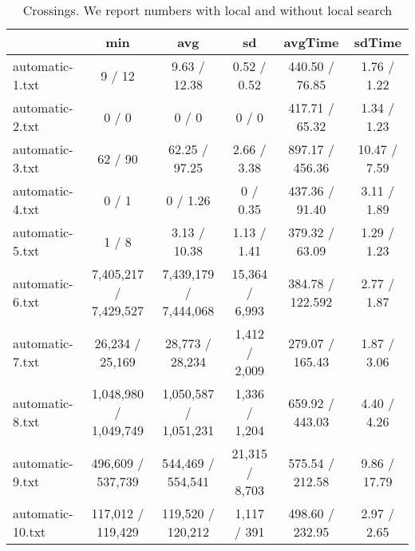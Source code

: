 \documentclass{scrartcl}
\begin{document}
\begin{table}
\scriptsize
\begin{tabular}{lccccc}
  \toprule  & min & avg & sd & avgTime & sdTime \\ 
  \midrule automatic-1.txt & 9 / 12 & 9.63 / 12.38 & 0.52 / 0.52 & 440.50 / 76.85 & 1.76 / 1.22 \\ 
  automatic-2.txt & 0 / 0 & 0 / 0  & 0 / 0 & 417.71 / 65.32 & 1.34 / 1.23 \\ 
  automatic-3.txt & 62 / 90 & 62.25 / 97.25 & 2.66 / 3.38 & 897.17 / 456.36 & 10.47 / 7.59 \\ 
  automatic-4.txt & 0 / 1 & 0 / 1.26 & 0 / 0.35 & 437.36 / 91.40 & 3.11 / 1.89 \\ 
  automatic-5.txt & 1 / 8 & 3.13 / 10.38 & 1.13 / 1.41 & 379.32 / 63.09 & 1.29 / 1.23 \\ 
  automatic-6.txt & 7,405,217 / 7,429,527 & 7,439,179 / 7,444,068 & 15,364 / 6,993 & 384.78 / 122.592 & 2.77 / 1.87 \\ 
  automatic-7.txt & 26,234 / 25,169 & 28,773 / 28,234 & 1,412 / 2,009 & 279.07 / 165.43 & 1.87 / 3.06 \\ 
  automatic-8.txt & 1,048,980 / 1,049,749 & 1,050,587 / 1,051,231  & 1,336 / 1,204 & 659.92 / 443.03 & 4.40 / 4.26 \\ 
  automatic-9.txt & 496,609 / 537,739 & 544,469 / 554,541 & 21,315 / 8,703 & 575.54 / 212.58 & 9.86 / 17.79 \\ 
  automatic-10.txt & 117,012 / 119,429 & 119,520 / 120,212 & 1,117 / 391 & 498.60 / 232.95 & 2.97 / 2.65 \\ 
  \bottomrule 
\end{tabular}
\caption{Crossings. We report numbers with local and without local search}
\end{table}
\end{document}
